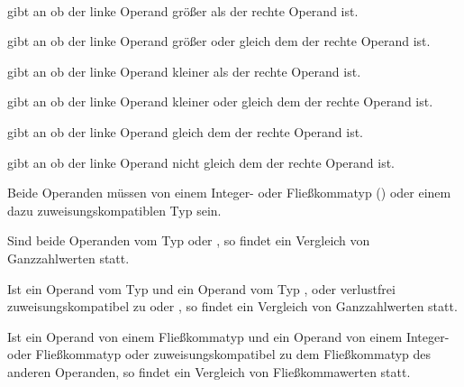 \hspace*{1cm}\Gt{>=}\Gspace{} \\
\hspace*{1cm}\Gt{>=}\Gspace{} \Gspace{} \\
\hspace*{1cm}\Gt{<}\Gspace{} \\
\hspace*{1cm}\Gt{<}\Gspace{} \Gspace{} \\
\hspace*{1cm}\Gt{<=}\Gspace{} \\
\hspace*{1cm}\Gt{<=}\Gspace{} \Gspace{} \\

\op{>} gibt an ob der linke Operand größer als der rechte Operand ist.

\op{>=} gibt an ob der linke Operand größer oder gleich dem der rechte Operand ist.

\op{<} gibt an ob der linke Operand kleiner als der rechte Operand ist.

\op{<=} gibt an ob der linke Operand kleiner oder gleich dem der rechte Operand ist.

\op{==} gibt an ob der linke Operand gleich dem der rechte Operand ist.

\op{!=} gibt an ob der linke Operand nicht gleich dem der rechte Operand ist.

Beide Operanden müssen von einem Integer- oder Fließkommatyp () oder einem
dazu zuweisungskompatiblen Typ sein.

Sind beide Operanden vom Typ  oder , so findet ein Vergleich von Ganzzahlwerten statt.

Ist ein Operand vom Typ  und ein Operand vom Typ ,  oder
verlustfrei zuweisungskompatibel zu  oder , so findet ein Vergleich von Ganzzahlwerten statt.

Ist ein Operand von einem Fließkommatyp und ein Operand von einem Integer- oder Fließkommatyp
oder zuweisungskompatibel zu dem Fließkommatyp des anderen Operanden,
so findet ein Vergleich von Fließkommawerten statt.


